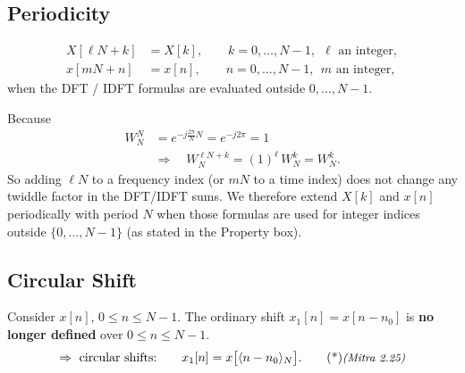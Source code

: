 \documentclass[handout_subfiles_root.tex]{subfiles}
\begin{document}

\subsection{Periodicity}

\begin{factbox}[title={Property}]
\begin{align*}
X[\ell N + k] &= X[k], \qquad k=0,\dots,N-1,\ \ \ell \text{ an integer}, \\
x[mN + n] &= x[n], \qquad n=0,\dots,N-1,\ \ m \text{ an integer},
\end{align*}
when the DFT / IDFT formulas are evaluated outside $0,\dots,N-1$.
\end{factbox}
Because
\begin{align*}
W_N^N &= e^{-j\frac{2\pi}{N}N} = e^{-j2\pi} = 1 \\
&\Rightarrow\quad W_N^{\ell N+k} = (1)^{\ell}\,W_N^{k} = W_N^{k}.
\end{align*}
\noindent So adding $\ell N$ to a frequency index (or $mN$ to a time index) does not change any twiddle factor in the DFT/IDFT sums.
We therefore extend $X[k]$ and $x[n]$ periodically with period $N$ when those formulas are used for integer indices outside $\{0,\dots,N-1\}$ (as stated in the Property box).

\subsection{Circular Shift}

Consider $x[n]$, $0\le n\le N-1$. The ordinary shift $x_1[n] = x[n-n_0]$ is \textbf{no longer defined} over $0\le n\le N-1$.
\begin{equation*}
\Rightarrow\ \text{circular shifts:}\qquad x_1[n] = x\big[\HandoutMod{n-n_0}{N}\big]. \MitraTag{2.25}
\end{equation*}
\end{document}
